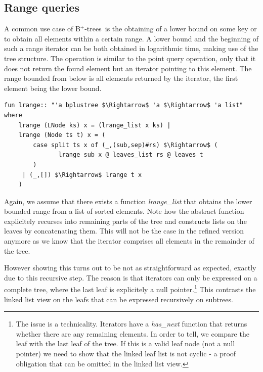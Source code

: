 \documentclass[a4paper,UKenglish,cleveref, autoref, thm-restate]{lipics-v2021}
\newcommand{\btrees}{B$^+$-trees}
\begin{document}
\subsection{Range queries}
\label{sec:imperative_range}

A common use case of \btrees\ 
is the obtaining of a lower bound on some key
or to obtain  all elements within a certain range. \cite{DBLP:journals/ftdb/Graefe11}
A lower bound and the beginning of such a range iterator
can be both obtained in logarithmic time, making use of the tree structure.
The operation is similar to the point query operation,
only that it does not return the
found element but an iterator pointing to this element.
The range bounded from below is all elements returned by the iterator,
the first element being the lower bound.

\begin{lstlisting}[mathescape=true, language=Isabelle,label=lst:btree-lrange]
fun lrange:: "'a bplustree $\Rightarrow$ 'a $\Rightarrow$ 'a list" where
    lrange (LNode ks) x = (lrange_list x ks) |
    lrange (Node ts t) x = (
        case split ts x of (_,(sub,sep)#rs) $\Rightarrow$ (
               lrange sub x @ leaves_list rs @ leaves t
        )
     | (_,[]) $\Rightarrow$ lrange t x
    )
\end{lstlisting}
  
Again, we assume that there exists a function \textit{lrange\_list} that
obtains the lower bounded range from a list of sorted elements.
Note how the abstract function explicitely recurses into
remaining parts of the tree and constructs lists on the leaves by concatenating them.
This will not be the case in the refined version anymore
as we know that the iterator comprises all elements in the remainder of the tree.

However showing this turns out to be not as straightforward
as expected, exactly due to this recursive step.
The reason is that iterators can only be expressed on a complete tree,
where the last leaf is explicitely a null pointer.\footnote{
    The issue is a technicality. Iterators have a \textit{has\_next} function
    that returns whether there are any remaining elements.
    In order to tell, we compare the leaf with the last leaf of the tree.
    If this is a valid leaf node (not a null pointer) we need to show
    that the linked leaf list is not cyclic - a proof obligation
    that can be omitted in the linked list view.
}
This contrasts the linked list view on the leafs that can be expressed
recursively on subtrees.
\end{document}
